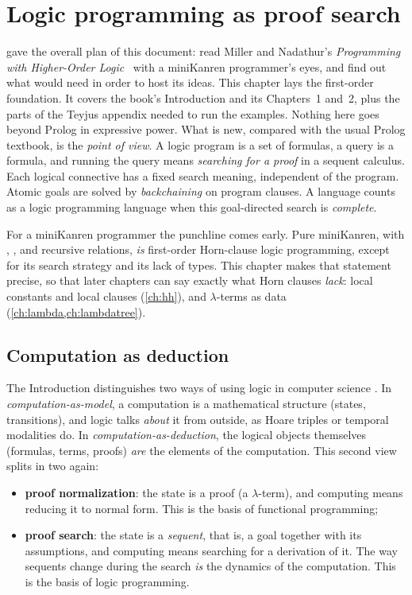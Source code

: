 \chapter{Logic programming as proof search}\label{ch:horn}

 gave the overall plan of this document: read Miller and Nadathur's \emph{Programming with
Higher-Order Logic}~\cite{MillerNadathur2012} with a miniKanren programmer's eyes, and find out what
\micro{} would need in order to host its ideas. This chapter lays the first-order foundation. It covers the
book's Introduction and its Chapters~1 and~2, plus the parts of the Teyjus appendix needed to run the
examples. Nothing here goes beyond Prolog in expressive power. What is new, compared with the usual
Prolog textbook, is the \emph{point of view}. A logic program is a set of formulas, a query is a formula,
and running the query means \emph{searching for a proof} in a sequent calculus. Each logical connective
has a fixed search meaning, independent of the program. Atomic goals are solved by \emph{backchaining}
on program clauses. A language counts as a logic programming language when this goal-directed search
is \emph{complete}.

For a miniKanren programmer the punchline comes early. Pure miniKanren, with ,
,  and recursive relations, \emph{is} first-order Horn-clause logic programming, except for its
search strategy and its lack of types. This chapter makes that statement precise, so that later
chapters can say exactly what Horn clauses \emph{lack}: local constants and local clauses
(\cref{ch:hh}), and $\lambda$-terms as data (\cref{ch:lambda,ch:lambdatree}).

\section{Computation as deduction}\label{sec:horn-deduction}

The Introduction distinguishes two ways of using logic in computer science . In
\emph{computation-as-model}, a computation is a mathematical structure (states, transitions), and
logic talks \emph{about} it from outside, as Hoare triples or temporal modalities do. In
\emph{computation-as-deduction}, the logical objects themselves (formulas, terms, proofs) \emph{are} the
elements of the computation. This second view splits in two again:
\begin{itemize}
  \item \textbf{proof normalization}: the state is a proof (a $\lambda$-term), and computing means reducing
    it to normal form. This is the basis of functional programming;
  \item \textbf{proof search}: the state is a \emph{sequent}, that is, a goal together with its assumptions,
    and computing means searching for a derivation of it. The way sequents change during the search
    \emph{is} the dynamics of the computation. This is the basis of logic programming.
\end{itemize}

